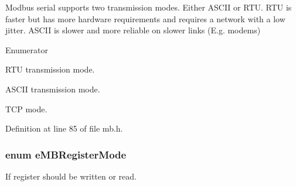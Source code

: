 Modbus serial supports two transmission modes. Either A\+S\+C\+II or R\+TU. R\+TU is faster but has more hardware requirements and requires a network with a low jitter. A\+S\+C\+II is slower and more reliable on slower links (E.\+g. modems) \begin{Desc}
\item[Enumerator]\par
\begin{description}
\item[{\em 
M\+B\+\_\+\+R\+TU\hypertarget{group__modbus_gga462d0d9396f02be6f9fd5b6f19463e61a1b807b8cf3d593d8cd8d1a1d21a3da31}{}\label{group__modbus_gga462d0d9396f02be6f9fd5b6f19463e61a1b807b8cf3d593d8cd8d1a1d21a3da31}
}]R\+TU transmission mode. \item[{\em 
M\+B\+\_\+\+A\+S\+C\+II\hypertarget{group__modbus_gga462d0d9396f02be6f9fd5b6f19463e61afa37751530d5e48cb5a3f8841f9e3143}{}\label{group__modbus_gga462d0d9396f02be6f9fd5b6f19463e61afa37751530d5e48cb5a3f8841f9e3143}
}]A\+S\+C\+II transmission mode. \item[{\em 
M\+B\+\_\+\+T\+CP\hypertarget{group__modbus_gga462d0d9396f02be6f9fd5b6f19463e61a5786284fe284b4a23889bf5b444d5142}{}\label{group__modbus_gga462d0d9396f02be6f9fd5b6f19463e61a5786284fe284b4a23889bf5b444d5142}
}]T\+CP mode. \end{description}
\end{Desc}


Definition at line 85 of file mb.\+h.

\subsubsection[{\texorpdfstring{e\+M\+B\+Register\+Mode}{eMBRegisterMode}}]{\setlength{\rightskip}{0pt plus 5cm}enum {\bf e\+M\+B\+Register\+Mode}}\hypertarget{group__modbus_gaf1398cbbeb317b1dbd0276b275f5b0f8}{}\label{group__modbus_gaf1398cbbeb317b1dbd0276b275f5b0f8}


If register should be written or read. 

